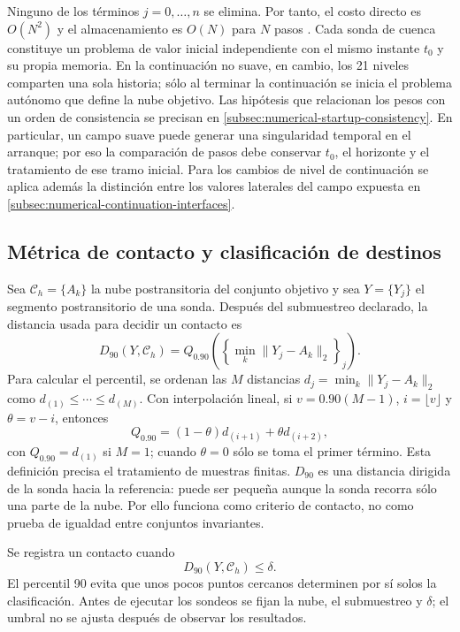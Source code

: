 Ninguno de los términos \(j=0,\ldots,n\) se elimina. Por tanto, el costo
directo es \(O(N^2)\) y el almacenamiento es \(O(N)\) para \(N\) pasos
\cite{DiethelmFordFreed2002}. Cada sonda de cuenca constituye un problema de
valor inicial independiente con el mismo instante \(t_0\) y su propia memoria.
En la continuación no suave, en cambio, los 21 niveles comparten una sola
historia; sólo al terminar la continuación se inicia el problema autónomo que
define la nube objetivo.
Las hipótesis que relacionan los pesos con un orden de consistencia se
precisan en \cref{subsec:numerical-startup-consistency}. En particular, un
campo suave puede generar una singularidad temporal en el arranque; por eso
la comparación de pasos debe conservar \(t_0\), el horizonte y el tratamiento
de ese tramo inicial. Para los cambios de nivel de continuación se aplica
además la distinción entre los valores laterales del campo expuesta en
\cref{subsec:numerical-continuation-interfaces}.

\subsection{Métrica de contacto y clasificación de destinos}
\label{subsec:clasificador}

Sea \(\mathcal C_h=\{A_k\}\) la nube postransitoria del conjunto objetivo y sea
\(Y=\{Y_j\}\) el segmento postransitorio de una sonda. Después del submuestreo
declarado, la distancia usada para decidir un contacto es
\begin{equation}
D_{90}(Y,\mathcal C_h)
=Q_{0.90}\left(
\left\{\min_k\|Y_j-A_k\|_2\right\}_j
\right).
\label{eq:d90_protocolo}
\end{equation}
Para calcular el percentil, se ordenan las \(M\) distancias
\(d_j=\min_k\|Y_j-A_k\|_2\) como
\(d_{(1)}\leq\cdots\leq d_{(M)}\). Con interpolación lineal, si
\(v=0.90(M-1)\), \(i=\lfloor v\rfloor\) y \(\theta=v-i\), entonces
\[
 Q_{0.90}=(1-\theta)d_{(i+1)}+\theta d_{(i+2)},
\]
con \(Q_{0.90}=d_{(1)}\) si \(M=1\); cuando \(\theta=0\) sólo se toma el
primer término. Esta definición precisa el tratamiento de muestras finitas.
\(D_{90}\) es una distancia dirigida de la sonda hacia la referencia:
puede ser pequeña aunque la sonda recorra sólo una parte de la nube. Por
ello funciona como criterio de contacto, no como prueba de igualdad entre
conjuntos invariantes.

Se registra un contacto cuando
\begin{equation}
D_{90}(Y,\mathcal C_h)\leq\delta .
\label{eq:contacto_protocolo}
\end{equation}
El percentil 90 evita que unos pocos puntos cercanos determinen por sí solos
la clasificación. Antes de ejecutar los sondeos se fijan la nube, el
submuestreo y \(\delta\); el umbral no se ajusta después de observar los
resultados.


